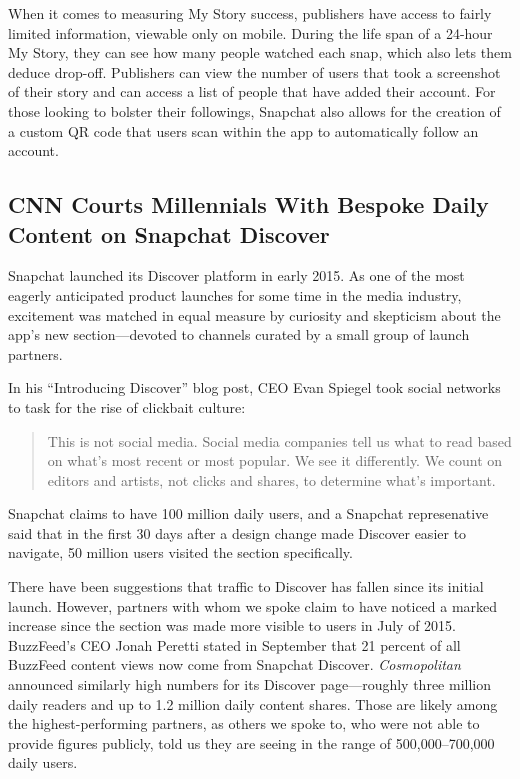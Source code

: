 \documentclass[notoc, symmetric, nobib, nols]{towcenter-guideto-book}
\begin{document}
When it comes to measuring My Story success, publishers have access to fairly limited information, viewable only on mobile. During the life span of a 24-hour My Story, they can see how many people watched each snap, which also lets them deduce drop-off. Publishers can view the number of users that took a screenshot of their story and can access a list of people that have added their account. For those looking to bolster their followings, Snapchat also allows for the creation of a custom QR code that users scan within the app to automatically follow an account.

\subsection{CNN Courts Millennials With Bespoke Daily Content on Snapchat Discover}

Snapchat launched its Discover platform in early 2015.\autocite{SnapchatDiscover} As one of the most eagerly anticipated product launches for some time in the media industry, excitement was matched in equal measure by curiosity and skepticism about the app's new section---devoted to channels curated by a small group of launch partners.

In his ``Introducing Discover'' blog post, CEO Evan Spiegel took social networks to task for the rise of clickbait culture: 

\begin{quote}
This is not social media. Social media companies tell us what to read based on what's most recent or most popular. We see it differently. We count on editors and artists, not clicks and shares, to determine what's important.\autocite{SnapchatDiscover}
\end{quote}

Snapchat claims to have 100 million daily users, and a Snapchat represenative said that in the first 30 days after a design change made Discover easier to navigate, 50 million users visited the section specifically.\autocite{DigidaySnapchat}

There have been suggestions that traffic to Discover has fallen since its initial launch. However, partners with whom we spoke claim to have noticed a marked increase since the section was made more visible to users in July of 2015. BuzzFeed's CEO Jonah Peretti stated in September that 21 percent of all BuzzFeed content views now come from Snapchat Discover.\autocite{RecodeBuzzfeed} \textit{Cosmopolitan} announced similarly high numbers for its Discover page---roughly three million daily readers and up to 1.2 million daily content shares.\autocite{DigidayCosmo} Those are likely among the highest-performing partners, as others we spoke to, who were not able to provide figures publicly, told us they are seeing in the range of 500,000--700,000 daily users. 
\end{document}
